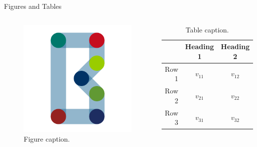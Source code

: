 \documentclass{beamer}
\begin{document}
    \begin{frame}{Figures and Tables}
        \begin{columns}
                \begin{figure}
                    \centering
                    \includegraphics[width=\linewidth]{images/bse.png}
                    \caption{Figure caption.}
                    \label{fig:bse_logo}
                \end{figure}
                
                \begin{table}
                    \centering
                    \begin{tabular}{rcc}
                    	\toprule
                         & Heading 1 & Heading 2 \\
                        \toprule
                        Row 1 & \(v_{11}\) & \(v_{12}\) \\
                        Row 2 & \(v_{21}\) & \(v_{22}\) \\
                        Row 3 & \(v_{31}\) & \(v_{32}\) \\
                        \bottomrule
                    \end{tabular}
                    \caption{Table caption.}
                    \label{tab:demo}
                \end{table}
        \end{columns}
    \end{frame}
    
\end{document}
